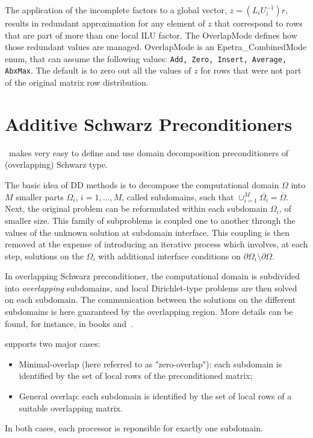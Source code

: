 \medskip

The application of the incomplete factors to a global vector, $z =
(L_iU_i^{-1}) r$, results in redundant approximation for any element of
$z$ that correspond to rows that are part of more than one local ILU
factor. The OverlapMode defines how those redundant values are managed.
OverlapMode is an Epetra\_CombinedMode enum, that can assume the
following values: {\tt Add, Zero, Insert, Average, AbxMax}. The default
is to zero out all the values of $z$ for rows that were not part of the
original matrix row distribution.

\section{Additive Schwarz Preconditioners}
\label{sec:additive}

\ifpack\ makes very easy to define and use domain decomposition
preconditioners of (overlapping) Schwarz type.

The basic idea of DD methods is to decompose the
computational domain $\Omega$ into $M$ smaller parts $\Omega_i$,
$i=1,\ldots,M$, called subdomains, such that $\cup_{i=1}^{M}
\overline{\Omega_i} = \overline{\Omega}$.  Next, the original problem can
be reformulated within each subdomain $\Omega_i$, of smaller size. This
family of subproblems is coupled one to another through the values of the
unknown solution at subdomain interface. This coupling is then removed at
the expense of introducing an iterative process which involves, at each
step, solutions on the $\Omega_i$ with additional interface conditions on
$\partial \Omega_i \setminus \partial \Omega$.

In overlapping Schwarz preconditioner, the computational domain is
subdivided into {\sl overlapping} subdomains, and local Dirichlet-type
problems are then solved on each subdomain.  The communication between the
solutions on the different subdomains is here guaranteed by the overlapping
region. More details can be found, for instance, in books
\cite{QV} and~\cite{smith96parallel}.

\ifpack supports two major cases:
\begin{itemize}
\item Minimal-overlap (here referred to as "zero-overlap"): each subdomain
is identified by the set of local rows of the preconditioned matrix;
\item General overlap: each subdomain is identified by the set of local rows
of a suitable overlapping matrix.
\end{itemize}
In both cases, each processor is reponsible for exactly one subdomain.

